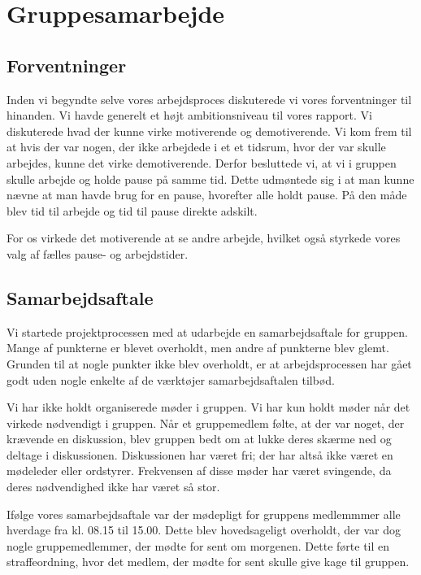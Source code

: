 \section{Gruppesamarbejde}

\subsection{Forventninger}
Inden vi begyndte selve vores arbejdsproces diskuterede vi vores forventninger til hinanden. Vi havde generelt et h\o{}jt ambitionsniveau til vores rapport. 
Vi diskuterede hvad der kunne virke motiverende og demotiverende. Vi kom frem til at hvis der var nogen, der ikke arbejdede i et et tidsrum, hvor der var skulle arbejdes, kunne det virke demotiverende.
Derfor besluttede vi, at vi i gruppen skulle arbejde og holde pause p\aa{} samme tid. Dette udm\o{}ntede sig i at man kunne n\ae{}vne at man havde brug for en pause, hvorefter alle holdt pause. 
P\aa{} den m\aa{}de blev tid til arbejde og tid til pause direkte adskilt.

For os virkede det motiverende at se andre arbejde, hvilket ogs\aa{} styrkede vores valg af f\ae{}lles pause- og arbejdstider.

\subsection{Samarbejdsaftale}
Vi startede projektprocessen med at udarbejde en samarbejdsaftale for gruppen. Mange af punkterne er blevet overholdt, men andre af punkterne blev glemt. 
Grunden til at nogle punkter ikke blev overholdt, er at arbejdsprocessen har g\aa{}et godt uden nogle enkelte af de v\ae{}rkt\o{}jer samarbejdsaftalen tilb\o{}d.


Vi har ikke holdt organiserede m\o{}der i gruppen. Vi har kun holdt m\o{}der n\aa{}r det virkede n\o{}dvendigt i gruppen. 
N\aa{}r et gruppemedlem f\o{}lte, at der var noget, der kr\ae{}vende en diskussion, blev gruppen bedt om at lukke deres sk\ae{}rme ned og deltage i diskussionen. 
Diskussionen har v\ae{}ret fri; der har alts\aa{} ikke v\ae{}ret en m\o{}deleder eller ordstyrer.
Frekvensen af disse m\o{}der har v\ae{}ret svingende, da deres n\o{}dvendighed ikke har v\ae{}ret s\aa{} stor.


If\o{}lge vores samarbejdsaftale var der m\o{}depligt for gruppens medlemmmer alle hverdage fra kl. 08.15 til 15.00. 
Dette blev hovedsageligt overholdt, der var dog nogle gruppemedlemmer, der m\o{}dte for sent om morgenen. 
Dette f\o{}rte til en straffeordning, hvor det medlem, der m\o{}dte for sent skulle give kage til gruppen. 


